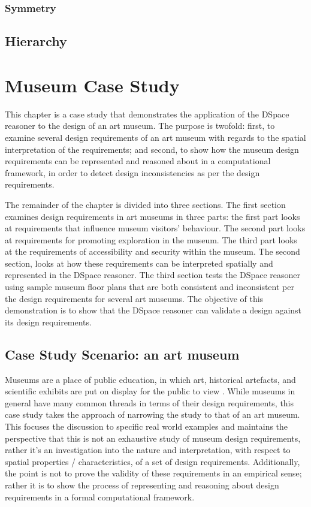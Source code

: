 \documentclass[12pt]{ucthesis}
\begin{document}
\subsection{Symmetry}


\section{Hierarchy}



\chapter{Museum Case Study}
This chapter is a case study that demonstrates the application of the DSpace reasoner to the design of an art museum. The purpose is twofold: first, to examine several design requirements of an art museum with regards to the spatial interpretation of the requirements; and second, to show how the museum design requirements can be represented and reasoned about in a computational framework, in order to detect design inconsistencies as per the design requirements.

The remainder of the chapter is divided into three sections. The first section examines design requirements in art museums in three parts: the first part looks at requirements that influence museum visitors' behaviour. The second part looks at requirements for promoting exploration in the museum. The third part looks at the requirements of accessibility and security within the museum. The second section, looks at how these requirements can be interpreted spatially and represented in the DSpace reasoner. The third section tests the DSpace reasoner using sample museum floor plans that are both consistent and inconsistent per the design requirements for several art museums. The objective of this demonstration is to show that the DSpace reasoner can validate a design against its design requirements.



\section{Case Study Scenario: an art museum}
Museums are a place of public education, in which art, historical artefacts, and scientific exhibits are put on display for the public to view \cite{Falk}. While museums in general have many common threads in terms of their design requirements, this case study takes the approach of narrowing the study to that of an art museum. This focuses the discussion to specific real world examples and maintains the perspective that this is not an exhaustive study of museum design requirements, rather it's an investigation into the nature and interpretation, with respect to spatial properties / characteristics, of a set of design requirements. Additionally, the point is not to prove the validity of these requirements in an empirical sense; rather it is to show the process of representing and reasoning about design requirements in a formal computational framework.
\end{document}
